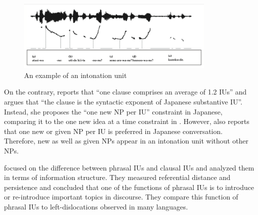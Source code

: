 \begin{figure}
 \centering
 \includegraphics[width=0.85\textwidth]{sounds/iwasaki_IU.png}
 \caption{An example of an intonation unit \cite[109]{iwasaki08}}
 \label{IUExF}
\end{figure}


On the contrary,  reports that
``one clause comprises an average of 1.2 IUs''
and argues that
``the clause is the syntactic exponent of Japanese substantive IU''.
Instead, she proposes the ``one new NP per IU'' constraint in Japanese,
comparing it to the one new idea at a time constraint in .
However,  also reports that
one new or given NP per IU is preferred in Japanese conversation.
Therefore,
new as well as given NPs appear in an intonation unit
without other NPs.




 focused on the difference between
phrasal IUs and clausal IUs and
analyzed them in terms of information structure.
They measured referential distance and persistence \cite{givon83} and concluded that
one of the functions of phrasal IUs is to introduce or re-introduce
important topics in discourse.
They compare this function of phrasal IUs to left-dislocations observed in many languages.

%




